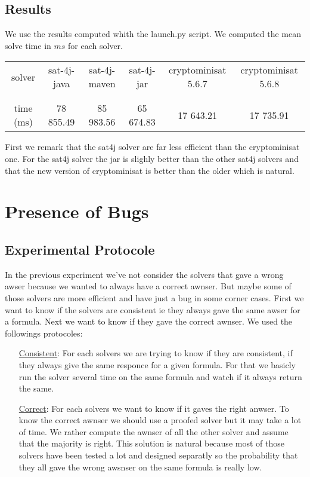 \documentclass{article}
\begin{document}
\subsection{Results}
We use the results computed whith the launch.py script. We computed the mean solve time in $ms$ for each solver.

\vskip 3mm

\begin{tabular}{|c|c|c|c|c|c|}
\hline
  solver & sat-4j-java & sat-4j-maven & sat-4j-jar & cryptominisat 5.6.7 & cryptominisat 5.6.8 \\
 & & & & & \\   \hline  & & & & & \\ 
  time (ms) & 78 855.49 & 85 983.56 & 65 674.83 &  17 643.21 & 17 735.91 \\
  \hline
\end{tabular}

\vskip 3mm

First we remark that the sat4j solver are far less efficient than the cryptominisat one. For the sat4j solver the jar is slighly better than the other sat4j solvers and that the new version of cryptominisat is better than the older which is natural. 

\section{Presence of Bugs}
\subsection{Experimental Protocole}
In the previous experiment we've not consider the solvers that gave a wrong awser because we wanted to always have a correct awnser. But maybe some of those solvers are more efficient and have just a bug in some corner cases. First we want to know if the solvers are consistent ie they always gave the same awser for a formula. Next we want to know if they gave the correct awnser.  
We used the followings protocoles:

\vskip 3mm

\begin{itemize}
\item[\underline{Consistent}:]  For each solvers we are trying to know if they are consistent, if they always give the same responce for a given formula. For that we basicly run the solver several time on the same formula and watch if it always return the same. 
\item[\underline{Correct}:] For each solvers we want to know if it gaves the right anwser. To know the correct awnser we should use a proofed solver but it may take a lot of time. We rather compute the awnser of all the other solver and assume that the majority is right. This solution is natural because most of those solvers have been tested a lot and designed separatly so the probability that they all gave the wrong awsnser on the same formula is really low. 
\end{itemize}
\end{document}
